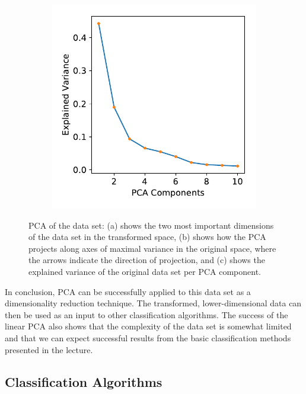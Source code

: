 \documentclass[12pt, a4paper]{scrartcl}
\begin{document}
\begin{figure}
\begin{subfigure}[b]{0.3\textwidth}
        \caption{}
        \label{fig:pca2}
    \end{subfigure}
    \begin{subfigure}[b]{0.3\textwidth}
        \includegraphics[width=\textwidth]{pca_2}
        \caption{}
        \label{fig:pca3}
    \end{subfigure}
    \caption{PCA of the data set: (a) shows the two most important dimensions of the data set in the transformed space, (b) shows how the PCA projects along axes of maximal variance in the original space, where the arrows indicate the direction of projection, and (c) shows the explained variance of the original data set per PCA component.}\label{fig:pca}
\end{figure}

In conclusion, PCA can be successfully applied to this data set as a dimensionality reduction technique. The transformed, lower-dimensional data can then be used as an input to other classification algorithms. The success of the linear PCA also shows that the complexity of the data set is somewhat limited and that we can expect successful results from the basic classification methods presented in the lecture.

\subsection{Classification Algorithms}
\end{document}
